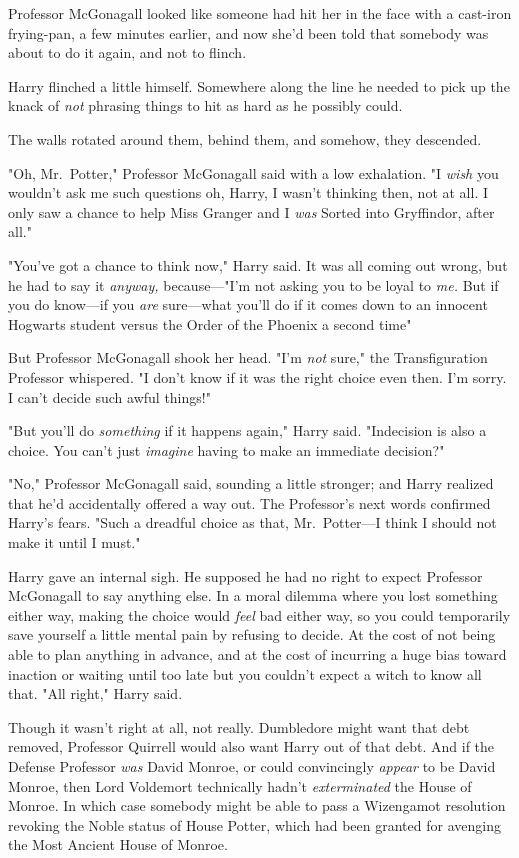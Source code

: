 Professor McGonagall looked like someone had hit her in the face with a
cast-iron frying-pan, a few minutes earlier, and now she'd been told that
somebody was about to do it again, and not to flinch.

Harry flinched a little himself. Somewhere along the line he needed to pick up
the knack of \emph{not} phrasing things to hit as hard as he possibly could.

The walls rotated around them, behind them, and somehow, they descended.

"Oh, Mr.~Potter," Professor McGonagall said with a low exhalation. "I{\el}
\emph{wish} you wouldn't ask me such questions{\el} oh, Harry, I wasn't
thinking then, not at all. I only saw a chance to help Miss Granger and{\el}
I \emph{was} Sorted into Gryffindor, after all."

"You've got a chance to think now," Harry said. It was all coming out wrong,
but he had to say it \emph{anyway,} because\mbox{---}"I'm not asking you to be loyal
to \emph{me.} But if you do know---if you \emph{are} sure---what you'll do if
it comes down to an innocent Hogwarts student versus the Order of the Phoenix a
second time{\el}"

But Professor McGonagall shook her head. "I'm \emph{not} sure," the
Transfiguration Professor whispered. "I don't know if it was the right choice
even then. I'm sorry. I can't decide such awful things!"

"But you'll do \emph{something} if it happens again," Harry said. "Indecision
is also a choice. You can't just \emph{imagine} having to make an immediate
decision?"

"No," Professor McGonagall said, sounding a little stronger; and Harry realized
that he'd accidentally offered a way out. The Professor's next words confirmed
Harry's fears. "Such a dreadful choice as that, Mr.~Potter---I think I should
not make it until I must."

Harry gave an internal sigh. He supposed he had no right to expect Professor
McGonagall to say anything else. In a moral dilemma where you lost something
either way, making the choice would \emph{feel} bad either way, so you could
temporarily save yourself a little mental pain by refusing to decide. At the
cost of not being able to plan anything in advance, and at the cost of
incurring a huge bias toward inaction or waiting until too late{\el} but you
couldn't expect a witch to know all that. "All right," Harry said.

Though it wasn't right at all, not really. Dumbledore might want that debt
removed, Professor Quirrell would also want Harry out of that debt. And if the
Defense Professor \emph{was} David Monroe, or could convincingly \emph{appear}
to be David Monroe, then Lord Voldemort technically hadn't \emph{exterminated}
the House of Monroe. In which case somebody might be able to pass a Wizengamot
resolution revoking the Noble status of House Potter, which had been granted
for avenging the Most Ancient House of Monroe.

